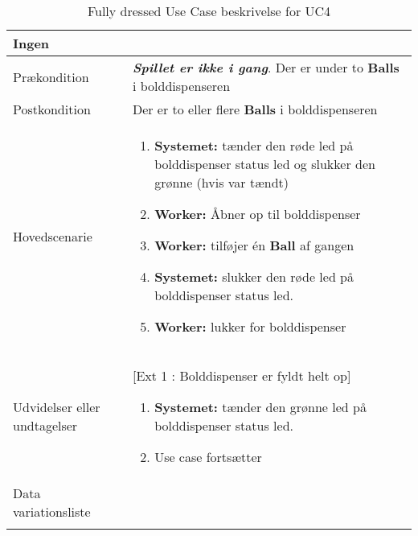 \documentclass[Kravspecifikation/Kravspec_Main.tex]{subfiles}
\begin{document}
\begin{longtable}[]{@{}ll@{}}
\begin{minipage}[t]{0.47\columnwidth}
{Ingen}\strut
\end{minipage}\tabularnewline
\toprule
\begin{minipage}[t]{0.47\columnwidth}\raggedright
{Prækondition}\strut
\end{minipage} & \begin{minipage}[t]{0.47\columnwidth}\raggedright
{\textbf{\textit{Spillet er ikke i gang}}.
Der er under to \textbf{Balls} i bolddispenseren}\strut
\end{minipage}\tabularnewline
\toprule
\begin{minipage}[t]{0.47\columnwidth}\raggedright
{Postkondition}\strut
\end{minipage} & \begin{minipage}[t]{0.47\columnwidth}\raggedright
{Der er to eller flere \textbf{Balls} i bolddispenseren }\strut
\end{minipage}\tabularnewline
\toprule
\begin{minipage}[t]{0.47\columnwidth}\raggedright
{Hovedscenarie}\strut
\end{minipage} & \begin{minipage}[t]{0.47\columnwidth}\raggedright
\begin{enumerate}
\tightlist
\item
  {\textbf{Systemet:} tænder den røde led på bolddispenser status led og slukker den grønne (hvis var tændt)}
\item
  {\textbf{Worker:} Åbner op til bolddispenser}
\item
  {\textbf{Worker:} tilføjer én \textbf{Ball} af gangen}
\item \textbf{Systemet:} slukker den røde led på bolddispenser status led. 
\item 
  {\textbf{Worker:} lukker for bolddispenser }
\end{enumerate}\strut
\end{minipage}\tabularnewline
\toprule
\begin{minipage}[t]{0.47\columnwidth}\raggedright
{Udvidelser eller undtagelser}\strut
\end{minipage} & \begin{minipage}[t]{0.47\columnwidth}\raggedright
{[Ext 1 : Bolddispenser er fyldt helt op]
\begin{enumerate}
\tightlist
\item
  \textbf{Systemet:} tænder den grønne led på bolddispenser status led.
\item  Use case fortsætter
\end{enumerate}
}\strut
\end{minipage}\tabularnewline
\toprule
\begin{minipage}[t]{0.47\columnwidth}\raggedright
{Data variationsliste}\strut
\end{minipage} & \begin{minipage}[t]{0.47\columnwidth}\raggedright
{}\strut
\end{minipage}\tabularnewline
\bottomrule
\bottomrule
\caption{Fully dressed Use Case beskrivelse for UC4}
\label{tab:UC4}
\end{longtable}
\end{document}
